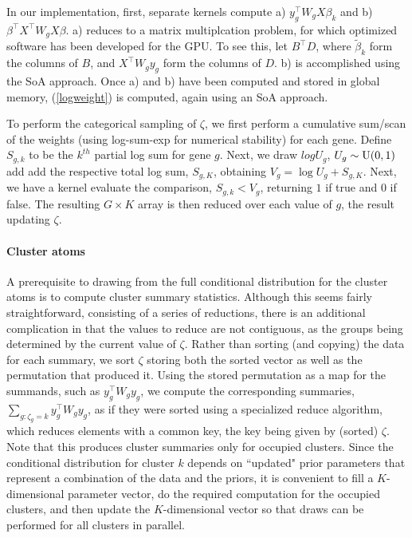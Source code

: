 {In our implementation, first, separate kernels compute a) $y_g^\top W_g X \beta_k$ and b) $\beta^\top X^\top W_g X \beta$. a) reduces to a matrix multiplcation problem, for which optimized software has been developed for the GPU. To see this, let $B^\top D$, where $\tilde{\beta}_k$ form the columns of $B$, and $X^\top W_g y_g$ form the columns of $D$. b) is accomplished using the SoA approach. Once a) and b) have been computed and stored in global memory, (\ref{logweight}) is computed, again using an SoA approach.

To perform the categorical sampling of $\zeta$, we first perform a cumulative sum/scan of the weights (using log-sum-exp for numerical stability) for each gene. Define $S_{g,k}$ to be the $k^{th}$ partial log sum for gene $g$. Next, we draw $log U_g$, $U_g \sim \operatorname{U}(0,1)$ add add the respective total log sum, $S_{g,K}$, obtaining $V_g = \log U_g + S_{g,K}$. Next, we have a kernel evaluate the comparison, $S_{g,k}<V_g$, returning $1$ if true and $0$ if false. The resulting $G\times K$ array is then reduced over each value of $g$, the result updating $\zeta$.

\paragraph{Cluster atoms}
A prerequisite to drawing from the full conditional distribution for the cluster atoms is to compute cluster summary statistics. Although this seems fairly straightforward, consisting of a series of reductions, there is an additional complication in that the values to reduce are not contiguous, as the groups being determined by the current value of $\zeta$. Rather than sorting (and copying) the data for each summary, we sort $\zeta$ storing both the sorted vector as well as the permutation that produced it. Using the stored permutation as a map for the summands, such as $y_g^\top W_g y_g$, we compute the corresponding summaries, $\sum_{g:\zeta_g=k}y_g^\top W_g y_g$, as if they were sorted using a specialized reduce algorithm, which reduces elements with a common key, the key being given by (sorted) $\zeta$. Note that this produces cluster summaries only for occupied clusters. Since the conditional distribution for cluster $k$ depends on ``updated" prior parameters that represent a combination of the data and the priors, it is convenient to fill a $K$-dimensional parameter vector, do the required computation for the occupied clusters, and then update the $K$-dimensional vector so that draws can be performed for all clusters in parallel.

}
